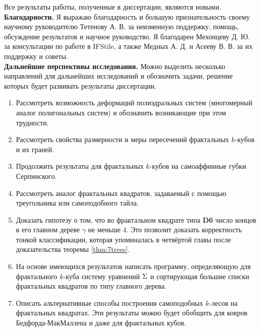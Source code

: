 Все результаты работы, полученные в диссертации, являются новыми.
\\

\textbf{Благодарности.}
Я выражаю благодарность и большую признательность своему научному руководителю Тетенову А. В. за неизменную поддержку, помощь, обсуждение результатов и научное руководство.
Я благодарен Мехонцеву Д. Ю.  за консультации по работе в IFStile, а также Медных А. Д. и Асееву В. В. за их поддержку и советы.\\


\textbf{Дальнейшие перспективы исследования.}
Можно выделить несколько направлений для дальнейших исследований и обозначить задачи, решение которых будет развивать результаты диссертации.
\begin{enumerate}
\item Рассмотреть возможность деформаций полиэдральных систем (многомерный аналог полигональных систем) и обозначить возникающие при этом трудности.
\item Рассмотреть свойства размерности и меры пересечений фрактальных $k$-кубов и их граней.
\item Продолжить результаты для фрактальных $k$-кубов на самоаффинные губки Серпинского.
\item Рассмотреть аналог фрактальных квадратов, задаваемый с помощью треугольника или самоподобного тайла.
\item Доказать гипотезу о том, что во фрактальном квадрате типа {\bf D6} число концов в его главном дереве $\gamma$ не меньше 4. 
Это позволит доказать корректность тонкой классификации, которая упоминалась в четвёртой главы после доказательства теоремы \ref{thm:7trees}.
\item На основе имеющихся результатов написать программу, определяющую для фрактального $k$-куба систему уравнений $\Sigma$ и сортирующая большие списки фрактальных квадратов по типу главного дерева.
\item Описать альтернативные способы построения самоподобных $k$-лесов на фрактальных квадратах.
Эти результаты можно будет обобщить для ковров Бедфорда-МакМаллена и даже для фрактальных кубов.  
\end{enumerate}